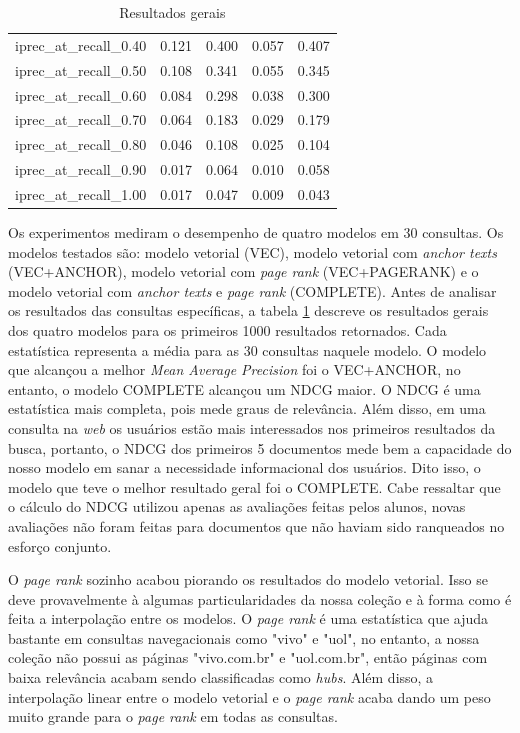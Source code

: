 \documentclass{article}
\begin{document}
\begin{table}
\begin{tabular}{ |l|l|l|l|l| }
  iprec\_at\_recall\_0.40  & 0.121 & 0.400 & 0.057 & 0.407 \\
  iprec\_at\_recall\_0.50  & 0.108 & 0.341 & 0.055 & 0.345 \\
  iprec\_at\_recall\_0.60  & 0.084 & 0.298 & 0.038 & 0.300 \\
  iprec\_at\_recall\_0.70  & 0.064 & 0.183 & 0.029 & 0.179 \\
  iprec\_at\_recall\_0.80  & 0.046 & 0.108 & 0.025 & 0.104 \\
  iprec\_at\_recall\_0.90  & 0.017 & 0.064 & 0.010 & 0.058 \\
  iprec\_at\_recall\_1.00  & 0.017 & 0.047 & 0.009 & 0.043 \\
  \hline
\end{tabular}
\caption{Resultados gerais}
\label{tab:general_results}
\end{table}

Os experimentos mediram o desempenho de quatro modelos em 30 consultas. Os modelos testados são: 
modelo vetorial (VEC), modelo vetorial com \textit{anchor texts} (VEC+ANCHOR), 
modelo vetorial com \textit{page rank} (VEC+PAGERANK) e o modelo vetorial com \textit{anchor texts} e \textit{page rank} (COMPLETE).
Antes de analisar os resultados das consultas específicas, a tabela \ref{tab:general_results} descreve
os resultados gerais dos quatro modelos para os primeiros 1000 resultados retornados. Cada estatística representa a média para
as 30 consultas naquele modelo. O modelo que alcançou a melhor \textit{Mean Average Precision} 
foi o VEC+ANCHOR, no entanto, o modelo COMPLETE alcançou um NDCG maior. O NDCG é uma estatística mais completa, pois mede graus de relevância. 
Além disso, em uma consulta na \textit{web} os usuários estão mais interessados nos primeiros resultados da busca, portanto,
o NDCG dos primeiros 5 documentos mede bem a capacidade do nosso modelo em sanar a necessidade informacional
dos usuários. Dito isso, o modelo que teve o melhor resultado geral foi o COMPLETE. Cabe ressaltar que o cálculo do NDCG
utilizou apenas as avaliações feitas pelos alunos, novas avaliações não foram feitas para documentos que não haviam
sido ranqueados no esforço conjunto.

O \textit{page rank} sozinho acabou piorando os resultados do modelo vetorial. Isso se deve provavelmente à 
algumas particularidades da nossa coleção e à forma como é feita a interpolação entre os modelos.
O \textit{page rank} é uma estatística que ajuda bastante em consultas navegacionais como "vivo" e "uol", no entanto, a nossa
coleção não possui as páginas "vivo.com.br" e "uol.com.br", então páginas com baixa relevância acabam sendo classificadas como
\textit{hubs}. Além disso, a interpolação linear entre o modelo vetorial e o \textit{page rank} acaba dando um peso muito grande
para o \textit{page rank} em todas as consultas.
\end{document}
